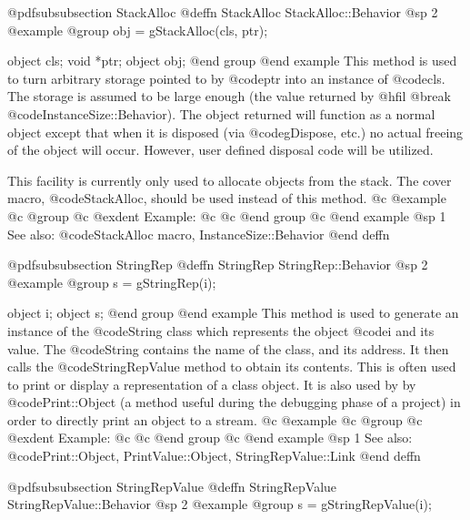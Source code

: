 @pdfsubsubsection {StackAlloc}
@deffn {StackAlloc} StackAlloc::Behavior
@sp 2
@example
@group
obj = gStackAlloc(cls, ptr);

object  cls;
void    *ptr;
object  obj;
@end group
@end example
This method is used to turn arbitrary storage pointed to by @code{ptr}
into an instance of @code{cls}.  The storage is assumed to be large
enough (the value returned by @hfil @break @code{InstanceSize::Behavior}).
The object returned will function as a normal object except that when it
is disposed (via @code{gDispose}, etc.) no actual freeing of the object
will occur.  However, user defined disposal code will be utilized.

This facility is currently only used to allocate objects from the
stack.  The cover macro, @code{StackAlloc}, should be used instead
of this method.
@c @example
@c @group
@c @exdent Example:
@c 
@c @end group
@c @end example
@sp 1
See also:  @code{StackAlloc macro, InstanceSize::Behavior}
@end deffn












@pdfsubsubsection {StringRep}
@deffn {StringRep} StringRep::Behavior
@sp 2
@example
@group
s = gStringRep(i);

object  i;
object  s;
@end group
@end example
This method is used to generate an instance of the @code{String} class
which represents the object @code{i} and its value.  The @code{String}
contains the name of the class, and its address.  It then calls the
@code{StringRepValue} method to obtain its contents.  This is often used
to print or display a representation of a class object.  It is also used
by by @code{Print::Object} (a method useful during the debugging phase
of a project) in order to directly print an object to a stream.
@c @example
@c @group
@c @exdent Example:
@c 
@c @end group
@c @end example
@sp 1
See also:  @code{Print::Object, PrintValue::Object, StringRepValue::Link}
@end deffn
















@pdfsubsubsection {StringRepValue}
@deffn {StringRepValue} StringRepValue::Behavior
@sp 2
@example
@group
s = gStringRepValue(i);

